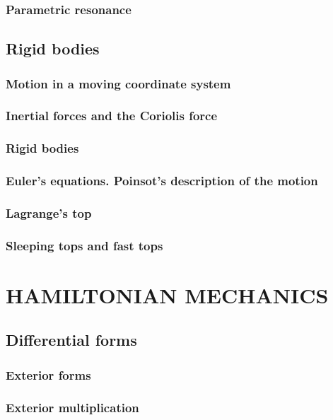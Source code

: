 \documentclass{book}
\numberwithin{equation}{section}
\theoremstyle{plain}
\theoremstyle{definition}
\theoremstyle{remark}
\theoremstyle{smallcap}
\numberwithin{prob}{section}
\begin{document}
\section{Parametric resonance}

\chapter{Rigid bodies}

\section{Motion in a moving coordinate system}

\section{Inertial forces and the Coriolis force}

\section{Rigid bodies}

\section{Euler's equations. Poinsot's description of the motion}

\section{Lagrange's top}

\section{Sleeping tops and fast tops}

\part{HAMILTONIAN MECHANICS}

\chapter{Differential forms}

\section{Exterior forms}

\section{Exterior multiplication}
\end{document}
